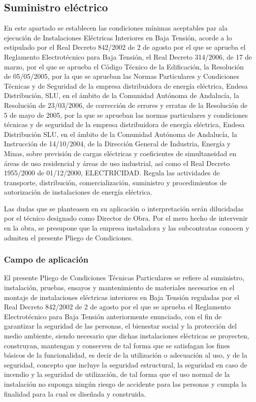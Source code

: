 \documentclass[../main.tex]{subfiles}
\begin{document}
\subsection{Suministro eléctrico}
En este apartado se establecen las condiciones mínimas aceptables par ala ejecución de Instalaciones Eléctricas Interiores en Baja Tensión, acorde a lo estipulado por el Real Decreto 842/2002 de 2 de agosto por el que se aprueba el Reglamento Electrotécnico para Baja Tensión, el Real Decreto 314/2006, de 17 de marzo, por el que se aprueba el Código Técnico de la Edificación, la Resolución de 05/05/2005, por la que se aprueban las Normas Particulares y Condiciones Técnicas y de Seguridad de la empresa distribuidora de energía eléctrica, Endesa Distribución, SLU, en el ámbito de la Comunidad Autónoma de Andalucía, la Resolución de 23/03/2006, de corrección de errores y erratas de la Resolución de 5 de mayo de 2005, por la que se aprueban las normas particulares y condiciones técnicas y de seguridad de la empresa distribuidora de energía eléctrica, Endesa Distribución SLU, en el ámbito de la Comunidad Autónoma de Andalucía, la Instrucción de 14/10/2004, de la Dirección General de Industria, Energía y Minas, sobre previsión de cargas eléctricas y coeficientes de simultaneidad en áreas de uso residencial y áreas de uso industrial, así como el Real Decreto 1955/2000 de 01/12/2000, ELECTRICIDAD. Regula las actividades de transporte, distribución, comercialización, suministro y procedimientos de autorización de instalaciones de energía eléctrica. \par
\vspace{0.5 cm}
Las dudas que se planteasen en su aplicación o interpretación serán dilucidadas por el técnico designado como Director de Obra. Por el mero hecho de intervenir en la obra, se presupone que la empresa instaladora y las subcontratas conocen y admiten el presente Pliego de Condiciones. \par

\subsubsection{Campo de aplicación}
El presente Pliego de Condiciones Técnicas Particulares se refiere al suministro, instalación, pruebas, ensayos y mantenimiento de materiales necesarios en el montaje de instalaciones eléctricas interiores en Baja Tensión reguladas por el Real Decreto 842/2002 de 2 de agosto por el que se aprueba el Reglamento Electrotécnico para Baja Tensión anteriormente enunciado, con el fin de garantizar la seguridad de las personas, el bienestar social y la protección del medio ambiente, siendo necesario que dichas instalaciones eléctricas se proyecten, construyan, mantengan y conserven de tal forma que se satisfagan los fines básicos de la funcionalidad, es decir de la utilización o adecuación al uso, y de la seguridad, concepto que incluye la seguridad estructural, la seguridad en caso de incendio y la seguridad de utilización, de tal forma que el uso normal de la instalación no suponga ningún riesgo de accidente para las personas y cumpla la finalidad para la cual es diseñada y construida.
\end{document}
